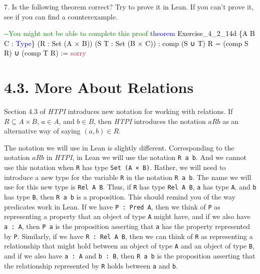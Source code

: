 \documentclass[
  letterpaper,
  DIV=11,
  numbers=noendperiod]{scrreprt}
\newenvironment{Shaded}{\begin{snugshade}}{\end{snugshade}}
\newcommand{\CommentTok}[1]{\textcolor[rgb]{0.37,0.37,0.37}{#1}}
\newcommand{\ConstantTok}[1]{\textcolor[rgb]{0.56,0.35,0.01}{#1}}
\newcommand{\KeywordTok}[1]{\textcolor[rgb]{0.00,0.23,0.31}{#1}}
\newcommand{\NormalTok}[1]{\textcolor[rgb]{0.00,0.23,0.31}{#1}}
\renewcommand{\NormalTok}[1]{\textcolor[HTML]{000000}{#1}}
\renewcommand{\KeywordTok}[1]{\textcolor[HTML]{0000FF}{#1}}
\renewcommand{\CommentTok}[1]{\textcolor[HTML]{008000}{#1}}
\renewcommand{\ConstantTok}[1]{\textcolor[HTML]{DC143C}{#1}}
\theoremstyle{remark}
\begin{document}
7. Is the following theorem correct? Try to prove it in Lean. If you
can't prove it, see if you can find a counterexample.

\begin{Shaded}
\begin{Highlighting}[]
\CommentTok{{-}{-}You might not be able to complete this proof}
\KeywordTok{theorem}\NormalTok{ Exercise\_4\_2\_14d \{A B C : }\KeywordTok{Type}\NormalTok{\}}
\NormalTok{    (R : Set (A × B)) (S T : Set (B × C)) :}
\NormalTok{    comp (S ∪ T) R = (comp S R) ∪ (comp T R) := }\ConstantTok{sorry}
\end{Highlighting}
\end{Shaded}

\hypertarget{more-about-relations}{%
\section{4.3. More About Relations}\label{more-about-relations}}

Section 4.3 of \emph{HTPI} introduces new notation for working with
relations. If \(R \subseteq A \times B\), \(a \in A\), and \(b \in B\),
then \emph{HTPI} introduces the notation \(aRb\) as an alternative way
of saying \((a, b) \in R\).

The notation we will use in Lean is slightly different. Corresponding to
the notation \(aRb\) in \emph{HTPI}, in Lean we will use the notation
\texttt{R\ a\ b}. And we cannot use this notation when \texttt{R} has
type \texttt{Set\ (A\ ×\ B)}. Rather, we will need to introduce a new
type for the variable \texttt{R} in the notation \texttt{R\ a\ b}. The
name we will use for this new type is \texttt{Rel\ A\ B}. Thus, if
\texttt{R} has type \texttt{Rel\ A\ B}, \texttt{a} has type \texttt{A},
and \texttt{b} has type \texttt{B}, then \texttt{R\ a\ b} is a
proposition. This should remind you of the way predicates work in Lean.
If we have \texttt{P\ :\ Pred\ A}, then we think of \texttt{P} as
representing a property that an object of type \texttt{A} might have,
and if we also have \texttt{a\ :\ A}, then \texttt{P\ a} is the
proposition asserting that \texttt{a} has the property represented by
\texttt{P}. Similarly, if we have \texttt{R\ :\ Rel\ A\ B}, then we can
think of \texttt{R} as representing a relationship that might hold
between an object of type \texttt{A} and an object of type \texttt{B},
and if we also have \texttt{a\ :\ A} and \texttt{b\ :\ B}, then
\texttt{R\ a\ b} is the proposition asserting that the relationship
represented by \texttt{R} holds between \texttt{a} and \texttt{b}.
\end{document}
